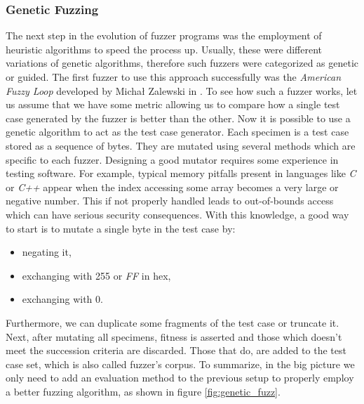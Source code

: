 \subsubsection{Genetic Fuzzing}

The next step in the evolution of fuzzer programs was the employment of heuristic algorithms to speed the process up. Usually, these were different variations of genetic algorithms, therefore such fuzzers were categorized as genetic or guided. The first fuzzer to use this approach successfully was the \textit{American Fuzzy Loop} developed by Michał Zalewski in \cite{afl}. To see how such a fuzzer works, let us assume that we have some metric allowing us to compare how a single test case generated by the fuzzer is better than the other. Now it is possible to use a genetic algorithm to act as the test case generator. Each specimen is a test case stored as a sequence of bytes. They are mutated using several methods which are specific to each fuzzer. Designing a good mutator requires some experience in testing software. For example, typical memory pitfalls present in languages like \textit{C} or \textit{C++} appear when the index accessing some array becomes a very large or negative number. This if not properly handled leads to out-of-bounds access which can have serious security consequences. With this knowledge, a good way to start is to mutate a single byte in the test case by:
\begin{itemize}
    \item negating it,
    \item exchanging with 255 or \textit{FF} in hex,
    \item exchanging with 0.
\end{itemize}
Furthermore, we can duplicate some fragments of the test case or truncate it. Next, after mutating all specimens, fitness is asserted and those which doesn't meet the succession criteria are discarded. Those that do, are added to the test case set, which is also called fuzzer's corpus. To summarize, in the big picture we only need to add an evaluation method to the previous setup to properly employ a better fuzzing algorithm, as shown in figure \ref{fig:genetic_fuzz}.  

